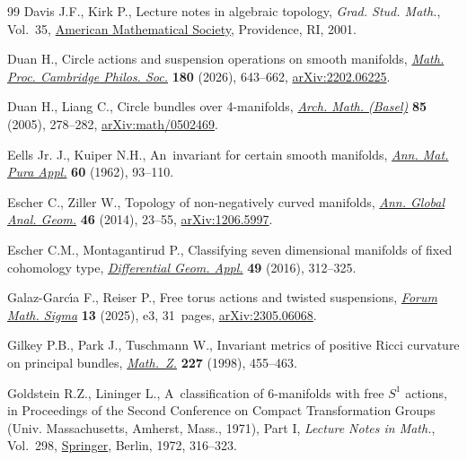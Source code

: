 \documentclass[pdftex]{sigma}
\numberwithin{equation}{section}
\theoremstyle{definition}
\numberwithin{table}{section}
\begin{document}
\begin{thebibliography}{99}
Davis J.F., Kirk P., Lecture notes in algebraic topology, \textit{Grad. Stud.
  Math.}, Vol.~35, \href{https://doi.org/10.1090/gsm/035}{American Mathematical
  Society}, Providence, RI, 2001.

Duan H., Circle actions and suspension operations on smooth manifolds,
  \href{https://doi.org/10.1017/S0305004125101849}{\textit{Math. Proc.
  Cambridge Philos. Soc.}} \textbf{180} (2026), 643--662,
  \href{https://arxiv.org/abs/2202.06225}{arXiv:2202.06225}.

Duan H., Liang C., Circle bundles over 4-manifolds,
  \href{https://doi.org/10.1007/s00013-005-1214-4}{\textit{Arch. Math.
  (Basel)}} \textbf{85} (2005), 278--282,
  \href{https://arxiv.org/abs/math/0502469}{arXiv:math/0502469}.

Eells Jr. J., Kuiper N.H., An~invariant for certain smooth manifolds,
  \href{https://doi.org/10.1007/BF02412768}{\textit{Ann. Mat. Pura Appl.}}
  \textbf{60} (1962), 93--110.

Escher C., Ziller W., Topology of non-negatively curved manifolds,
  \href{https://doi.org/10.1007/s10455-013-9407-8}{\textit{Ann. Global Anal.
  Geom.}} \textbf{46} (2014), 23--55,
  \href{https://arxiv.org/abs/1206.5997}{arXiv:1206.5997}.

Escher C.M., Montagantirud P., Classifying seven dimensional manifolds of fixed
  cohomology type,
  \href{https://doi.org/10.1016/j.difgeo.2016.09.006}{\textit{Differential
  Geom. Appl.}} \textbf{49} (2016), 312--325.

Galaz-Garc\'{\i}a F., Reiser P., Free torus actions and twisted suspensions,
  \href{https://doi.org/10.1017/fms.2024.141}{\textit{Forum Math. Sigma}}
  \textbf{13} (2025), e3, 31~pages,
  \href{https://arxiv.org/abs/2305.06068}{arXiv:2305.06068}.

Gilkey P.B., Park J., Tuschmann W., Invariant metrics of positive {R}icci
  curvature on principal bundles,
  \href{https://doi.org/10.1007/PL00004385}{\textit{Math.~Z.}} \textbf{227}
  (1998), 455--463.

Goldstein R.Z., Lininger L., A~classification of {$6$}-manifolds with free
  {$S^1$} actions, in Proceedings of the {S}econd {C}onference on {C}ompact
  {T}ransformation {G}roups ({U}niv. {M}assachusetts, {A}mherst, {M}ass.,
  1971), {P}art {I}, \textit{Lecture Notes in Math.}, Vol.~298,
  \href{https://doi.org/10.1007/BFb0070052}{Springer}, Berlin, 1972, 316--323.


\end{thebibliography}
\end{document}
